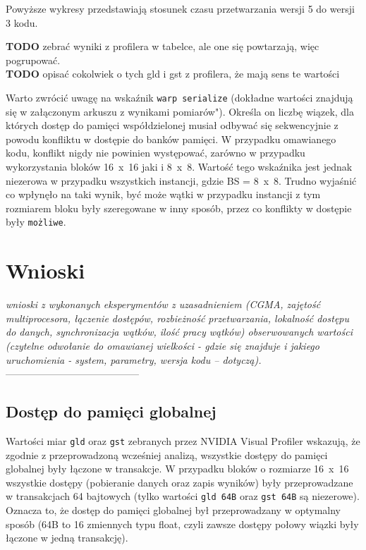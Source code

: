\documentclass[12pt,a4paper]{article}
\begin{document}
Powyższe wykresy przedstawiają stosunek czasu przetwarzania wersji 5 do wersji 3 kodu.

\textbf{TODO} zebrać wyniki z profilera w tabelce, ale one się powtarzają, więc pogrupować.\\
\textbf{TODO} opisać cokolwiek o tych gld i gst z profilera, że mają sens te wartości

Warto zwrócić uwagę na wskaźnik \verb|warp serialize| (dokładne wartości znajdują się w załączonym arkuszu z wynikami pomiarów"). Określa on liczbę wiązek, dla których dostęp do pamięci współdzielonej musiał odbywać się sekwencyjnie z powodu konfliktu w dostępie do banków pamięci. W przypadku omawianego kodu, konflikt nigdy nie powinien występować, zarówno w przypadku wykorzystania bloków 16~x~16 jaki i 8~x~8. Wartość tego wskaźnika jest jednak niezerowa w przypadku wszystkich instancji, gdzie BS = 8~x~8. Trudno wyjaśnić co wpłynęło na taki wynik, być może wątki w przypadku instancji z tym rozmiarem bloku były szeregowane w inny sposób, przez co konflikty w dostępie były \texttt{możliwe}.

\section{Wnioski}

\textit{wnioski z wykonanych eksperymentów z uzasadnieniem (CGMA, zajętość multiprocesora, łączenie dostępów,
rozbieżność przetwarzania, lokalność dostępu do danych, synchronizacja wątków, ilość pracy wątków)
obserwowanych wartości (czytelne odwołanie do omawianej wielkości - gdzie się znajduje i jakiego
uruchomienia - system, parametry, wersja kodu – dotyczą).}\\
-----------------------------------------

\subsection{Dostęp do pamięci globalnej}

Wartości miar \verb|gld| oraz \verb|gst| zebranych przez NVIDIA Visual Profiler wskazują, że zgodnie z przeprowadzoną wcześniej analizą, wszystkie dostępy do pamięci globalnej były łączone w transakcje. W przypadku bloków o rozmiarze 16~x~16 wszystkie dostępy (pobieranie danych oraz zapis wyników) były przeprowadzane w transakcjach 64 bajtowych (tylko wartości \verb|gld 64B| oraz \verb|gst 64B| są niezerowe). Oznacza to, że dostęp do pamięci globalnej był przeprowadzany w optymalny sposób (64B to 16 zmiennych typu float, czyli zawsze dostępy połowy wiązki były łączone w jedną transakcję).
\end{document}
